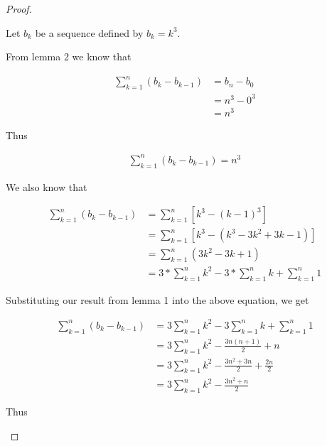 \documentclass{article}
\begin{document}
\begin{proof}
\begin{flushleft}
Let $b_{k}$ be a sequence defined by $b_{k} = k^3$.
\end{flushleft}

\begin{flushleft}
From lemma 2 we know that
\end{flushleft}

\begin{align*}
\sum_{k=1}^{n} (b_{k} - b_{k-1}) &= b_{n} - b_{0} \\
&= n^3 - 0^3 \\
&= n^3
\end{align*}

\begin{flushleft}
Thus 
\end{flushleft}

\begin{align}
\sum_{k=1}^{n} (b_{k} - b_{k-1}) = n^3
\end{align}

\begin{flushleft}
We also know that 
\end{flushleft}

\begin{align*}
\sum_{k=1}^{n} (b_{k} - b_{k-1}) &= \sum_{k=1}^{n} [k^3 - (k-1)^3] \\
&= \sum_{k=1}^{n} [k^3 - (k^3 - 3k^2 + 3k - 1)] \\
&= \sum_{k=1}^{n} (3k^2 - 3k + 1) \\
&= 3 * \sum_{k=1}^{n} k^2 - 3 * \sum_{k=1}^{n} k + \sum_{k=1}^{n} 1
\end{align*}

\begin{flushleft}
Substituting our result from lemma 1 into the above equation, we get
\end{flushleft}

\begin{align*}
\sum_{k=1}^{n} (b_{k} - b_{k-1}) &= 3 \sum_{k=1}^{n} k^2 - 3 \sum_{k=1}^{n} k + \sum_{k=1}^{n} 1 \\
&= 3 \sum_{k=1}^{n} k^2 - \frac{3n(n+1)}{2} + n \\
&= 3 \sum_{k=1}^{n} k^2 - \frac{3n^2+3n}{2} + \frac{2n}{2} \\
&=  3 \sum_{k=1}^{n} k^2 - \frac{3n^2+n}{2}
\end{align*}

\begin{flushleft}
Thus 
\end{flushleft}


\end{proof}
\end{document}
